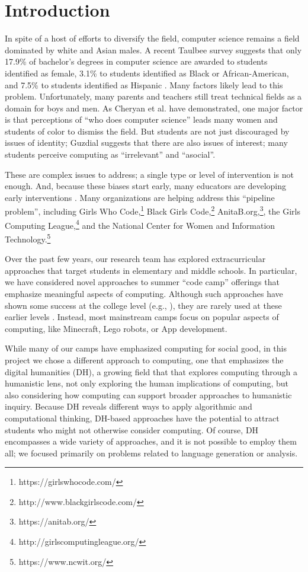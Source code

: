 \section{Introduction}

In spite of a host of efforts to diversify the field, computer
science remains a field dominated by white and Asian males.  A
recent Taulbee survey \cite{Taulbee2016} suggests that only 17.9\%
of bachelor's degrees in computer science are awarded to students
identified as female, 3.1\% to students identified as Black or
African-American, and 7.5\% to students identified as Hispanic
\cite{Taulbee2016}.  Many factors likely lead to this
problem.  Unfortunately, many parents and teachers still treat
technical fields as a domain for boys and men.  As Cheryan et al.
\cite{Cheryan2010} have demonstrated, one major factor is that
perceptions of ``who does computer science'' leads many women and
students of color to dismiss the field.  But students are not
just discouraged by issues of identity; Guzdial \cite{Guzdial2009}
suggests that there are also issues of interest; many students
perceive computing as ``irrelevant'' and ``asocial''.

These are complex issues to address; a single type or level of
intervention is not enough.  And, because these biases start early,
many educators are developing early interventions
\cite{McGill2015,Decker2016}.  Many organizations are helping address
this ``pipeline problem'', including Girls Who
Code,\footnote{https://girlswhocode.com/} Black Girls
Code,\footnote{http://www.blackgirlscode.com/}
AnitaB.org,\footnote{https://anitab.org/}, the Girls Computing
League,\footnote{http://girlscomputingleague.org/} and the National
Center for Women and Information
Technology.\footnote{https://www.ncwit.org/}

Over the past few years, our research team has explored extracurricular
approaches that target students in elementary and middle schools.
In particular, we have considered novel approaches to summer ``code
camp'' offerings that emphasize meaningful aspects of computing.
Although such approaches have shown some success at the college
level (e.g., \cite{Goldweber2013, Goldweber2018}), they are rarely
used at these earlier levels \cite{DeWitt2017}.  Instead, most
mainstream camps focus on popular aspects of computing, like
Minecraft, Lego robots, or App development.

While many of our camps have emphasized computing for social good,
in this project we chose a different approach to computing, one
that emphasizes the digital humanities (DH), a growing field that
that explores computing through a humanistic lens, not only exploring
the human implications of computing, but also considering how
computing can support broader approaches to humanistic inquiry.
Because DH reveals different ways to apply algorithmic and computational
thinking, DH-based approaches have the potential to attract students
who might not otherwise consider computing.  Of course, DH encompasses
a wide variety of approaches, and it is not possible to employ them
all; we focused primarily on problems related to language generation
or analysis.

